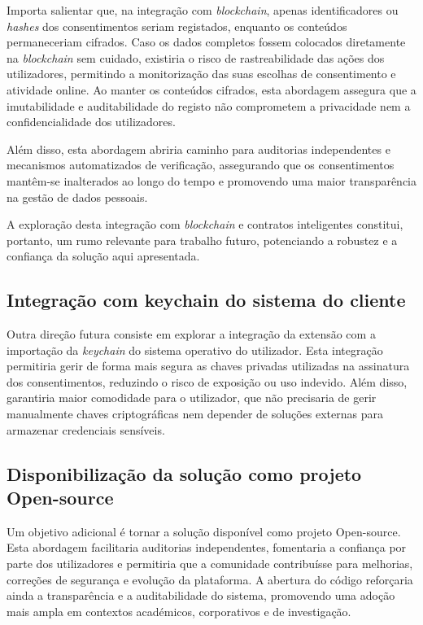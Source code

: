 Importa salientar que, na integração com \textit{blockchain}, apenas identificadores ou \textit{hashes} dos consentimentos seriam registados, enquanto os conteúdos permaneceriam cifrados. Caso os dados completos fossem colocados diretamente na \textit{blockchain} sem cuidado, existiria o risco de rastreabilidade das ações dos utilizadores, permitindo a monitorização das suas escolhas de consentimento e atividade online. Ao manter os conteúdos cifrados, esta abordagem assegura que a imutabilidade e auditabilidade do registo não comprometem a privacidade nem a confidencialidade dos utilizadores.

Além disso, esta abordagem abriria caminho para auditorias independentes e mecanismos automatizados de verificação, assegurando que os consentimentos mantêm-se inalterados ao longo do tempo e promovendo uma maior transparência na gestão de dados pessoais.

A exploração desta integração com \textit{blockchain} e contratos inteligentes constitui, portanto, um rumo relevante para trabalho futuro, potenciando a robustez e a confiança da solução aqui apresentada.

\subsection{Integração com keychain do sistema do cliente}

Outra direção futura consiste em explorar a integração da extensão com a importação da \textit{keychain} do sistema operativo do utilizador. Esta integração permitiria gerir de forma mais segura as chaves privadas utilizadas na assinatura dos consentimentos, reduzindo o risco de exposição ou uso indevido. Além disso, garantiria maior comodidade para o utilizador, que não precisaria de gerir manualmente chaves criptográficas nem depender de soluções externas para armazenar credenciais sensíveis.

\subsection{Disponibilização da solução como projeto Open-source}

Um objetivo adicional é tornar a solução disponível como projeto Open-source. Esta abordagem facilitaria auditorias independentes, fomentaria a confiança por parte dos utilizadores e permitiria que a comunidade contribuísse para melhorias, correções de segurança e evolução da plataforma. A abertura do código reforçaria ainda a transparência e a auditabilidade do sistema, promovendo uma adoção mais ampla em contextos académicos, corporativos e de investigação.

